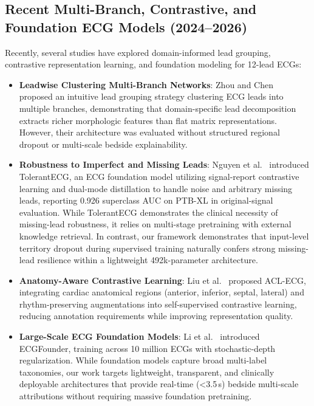 \documentclass[12pt]{elsarticle}
\begin{document}
\subsection{Recent Multi-Branch, Contrastive, and Foundation ECG Models (2024--2026)}
Recently, several studies have explored domain-informed lead grouping, contrastive representation learning, and foundation modeling for 12-lead ECGs:
\begin{itemize}
    \item \textbf{Leadwise Clustering Multi-Branch Networks}: Zhou and Chen~\cite{zhou2024leadwise} proposed an intuitive lead grouping strategy clustering ECG leads into multiple branches, demonstrating that domain-specific lead decomposition extracts richer morphologic features than flat matrix representations. However, their architecture was evaluated without structured regional dropout or multi-scale bedside explainability.
    \item \textbf{Robustness to Imperfect and Missing Leads}: Nguyen et al.~\cite{nguyen2025tolerantecg} introduced TolerantECG, an ECG foundation model utilizing signal-report contrastive learning and dual-mode distillation to handle noise and arbitrary missing leads, reporting 0.926 superclass AUC on PTB-XL in original-signal evaluation. While TolerantECG demonstrates the clinical necessity of missing-lead robustness, it relies on multi-stage pretraining with external knowledge retrieval. In contrast, our framework demonstrates that input-level territory dropout during supervised training naturally confers strong missing-lead resilience within a lightweight 492k-parameter architecture.
    \item \textbf{Anatomy-Aware Contrastive Learning}: Liu et al.~\cite{liu2026acl} proposed ACL-ECG, integrating cardiac anatomical regions (anterior, inferior, septal, lateral) and rhythm-preserving augmentations into self-supervised contrastive learning, reducing annotation requirements while improving representation quality.
    \item \textbf{Large-Scale ECG Foundation Models}: Li et al.~\cite{li2025ecgfounder} introduced ECGFounder, training across 10 million ECGs with stochastic-depth regularization. While foundation models capture broad multi-label taxonomies, our work targets lightweight, transparent, and clinically deployable architectures that provide real-time (<3.5\,s) bedside multi-scale attributions without requiring massive foundation pretraining.
\end{itemize}
\end{document}
